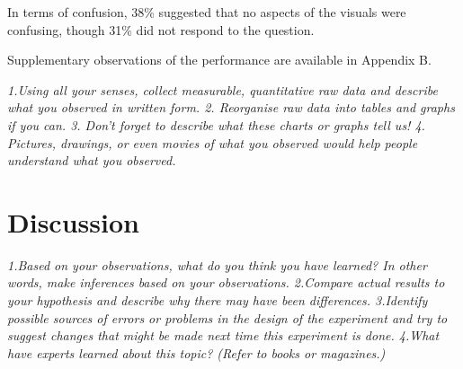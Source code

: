 In terms of confusion, 38\% suggested that no aspects of the visuals were confusing, though 31\% did not respond to the question.

Supplementary observations of the performance are available in Appendix B.

\textit{1.Using all your senses, collect measurable, quantitative raw data and describe what you observed in written form.
2. Reorganise raw data into tables and graphs if you can.
3. Don't forget to describe what these charts or graphs tell us!
4. Pictures, drawings, or even movies of what you observed would help people understand what you observed.}

\section{Discussion}
\label{sec:fieldstudydiscussion}

\textit{1.Based on your observations, what do you think you have learned? In other words, make inferences based on your observations.
2.Compare actual results to your hypothesis and describe why there may have been differences.
3.Identify possible sources of errors or problems in the design of the experiment and try to suggest changes that might be made next time this experiment is done.
4.What have experts learned about this topic? (Refer to books or magazines.)}







